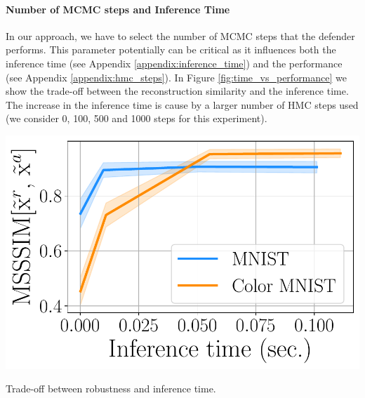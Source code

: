 \paragraph{Number of MCMC steps and Inference Time}
In our approach, we have to select the number of MCMC steps that the defender performs. This parameter potentially can be critical as it influences both the inference time (see Appendix \ref{appendix:inference_time}) and the performance (see Appendix \ref{appendix:hmc_steps}). 
In Figure \ref{fig:time_vs_performance} we show the trade-off between the reconstruction similarity and the inference time. The increase in the inference time is cause by a larger number of HMC steps used (we consider 0, 100, 500 and 1000 steps for this experiment).
\begin{marginfigure}
	\vspace*{-8\baselineskip}
	\includegraphics[width=\linewidth]{pics/3_adv_att/hmc_steps_time_ref_rec_sim.pdf} 
	\caption{Trade-off between robustness and inference time.}
	\label{fig:time_vs_performance}
\end{marginfigure}


